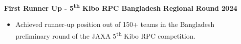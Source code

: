 \noindent
{\noindent\fontsize{12pt}{15pt}\bfseries First Runner Up - 5\textsuperscript{th} Kibo RPC Bangladesh Regional Round 2024}
\begin{itemize}[leftmargin=1em, itemsep=0em, labelsep=0.5em]
    \item Achieved runner-up position out of 150+ teams in the Bangladesh preliminary round of the JAXA 5\textsuperscript{th} Kibo RPC competition.
\end{itemize}